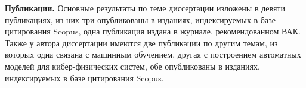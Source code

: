 \textbf{Публикации.}
Основные результаты по теме диссертации изложены в девяти публикациях, из них три опубликованы в изданиях, индексируемых в базе цитирования Scopus, одна публикация издана в журнале, рекомендованном ВАК.
Также у автора диссертации имеются две публикации по другим темам, из которых одна связана с машинным обучением, другая с построением автоматных моделей для кибер-физических систем, обе опубликованы в изданиях, индексируемых в базе цитирования Scopus.